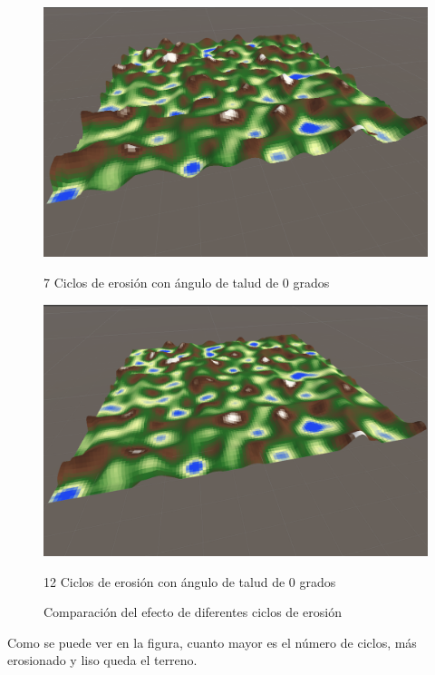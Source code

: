 \begin{figure}[ht]
    \vspace{0.5cm} %
    
    \begin{minipage}{0.4\textwidth}
        \centering
        \includegraphics[width=\textwidth]{img/7ciclos.png}
        \caption{7 Ciclos de erosión con ángulo de talud de 0 grados}
    \end{minipage}%
    \hfill
    \begin{minipage}{0.4\textwidth}
        \centering
        \includegraphics[width=\textwidth]{img/12ciclos.png}
        \caption{12 Ciclos de erosión con ángulo de talud de 0 grados}
    \end{minipage}
    \caption{Comparación del efecto de diferentes ciclos de erosión}
\end{figure}

Como se puede ver en la figura, cuanto mayor es el número de ciclos, más erosionado y liso queda el terreno.

